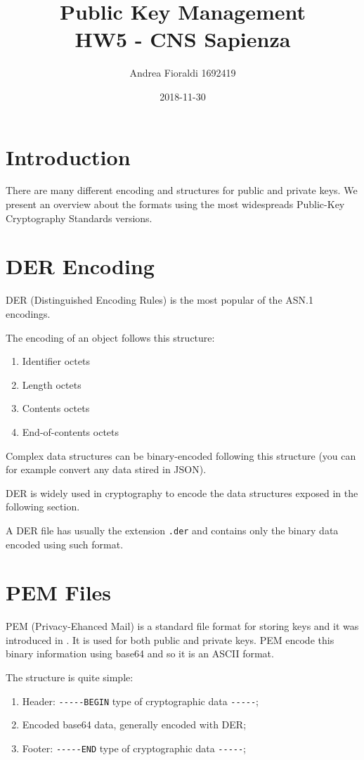 \documentclass[11pt]{article}
\title{{\bf Public Key Management} \\ \bigskip \large HW5 - CNS Sapienza}
\date{2018-11-30}
\author{Andrea Fioraldi 1692419}
\begin{document}
\maketitle

\section{Introduction}

There are many different encoding and structures for public and private keys.
We present an overview about the formats using the most widespreads Public-Key Cryptography Standards \cite{pkcs} versions.

\section{DER Encoding}

DER (Distinguished Encoding Rules) is the most popular of the ASN.1 \cite{asn1} encodings.

The encoding of an object follows this structure:
\begin{enumerate}
    \item Identifier octets
    \item Length octets
    \item Contents octets
    \item End-of-contents octets 
\end{enumerate}

Complex data structures can be binary-encoded following this structure (you can for example convert any data stired in JSON).

DER is widely used in cryptography to encode the data structures exposed in the following section.

A DER file has usually the extension \verb|.der| and contains only the binary data encoded using such format.

\section{PEM Files}

PEM (Privacy-Ehanced Mail) is a standard file format for storing keys and it was introduced in \cite{rfc7468}.
It is used for both public and private keys.
PEM encode this binary information using base64 and so it is an ASCII format.

The structure is quite simple:
\begin{enumerate}
    \item Header: \verb|-----BEGIN| type of cryptographic data \verb|-----|;
    \item Encoded base64 data, generally encoded with DER;
    \item Footer: \verb|-----END| type of cryptographic data \verb|-----|;
\end{enumerate}
\end{document}

